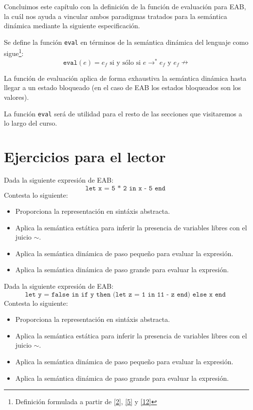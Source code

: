     Concluimos este capítulo con la definición de la función de evaluación para \textsf{EAB}, la cuál nos ayuda a vincular ambos paradigmas tratados para la semántica dinámica mediante la siguiente especificación.
    \begin{definition} Se define la función \texttt{eval} en términos de la semántica dinámica del lenguaje como sigue\footnote{Definición formulada a partir de \hyperlink{2}{[2]}, \hyperlink{5}{[5]} y  \hyperlink{12}{[12]} }:
    $$\texttt{eval}(e)=e_f\mbox{ si y sólo si } e \rightarrow^* e_f \mbox{ y }e_f \nrightarrow $$

    La función de evaluación aplica de forma exhaustiva la semántica dinámica hasta llegar a un estado bloqueado (en el caso de \textsf{EAB} los estados bloqueados son los valores).
    \end{definition}
    
    La función \texttt{eval} será de utilidad para el resto de las secciones que visitaremos a lo largo del curso.
    
    \section{Ejercicios para el lector}

	\begin{exercise}
		Dada la siguiente expresión de \textsf{EAB}:
		$$ \texttt{let x = 5 * 2 in x - 5 end }$$
		Contesta lo siguiente:		
		\begin{itemize}
			\item Proporciona la representación en sintáxis abstracta.
			\item Aplica la semántica estática para inferir la presencia de variables libres con el juicio $ \sim $.
			\item Aplica la semántica dinámica de paso pequeño para evaluar la expresión.
			\item Aplica la semántica dinámica de paso grande para evaluar la expresión.
		\end{itemize}
	\end{exercise}

	\begin{exercise}
		Dada la siguiente expresión de \textsf{EAB}:
		$$ \texttt{let y = false in if y then (let z = 1 in 11 - z end) else x end }$$
		Contesta lo siguiente:		
		\begin{itemize}
			\item Proporciona la representación en sintáxis abstracta.
			\item Aplica la semántica estática para inferir la presencia de variables libres con el juicio $ \sim $.
			\item Aplica la semántica dinámica de paso pequeño para evaluar la expresión.
			\item Aplica la semántica dinámica de paso grande para evaluar la expresión.
		\end{itemize}
	\end{exercise}


